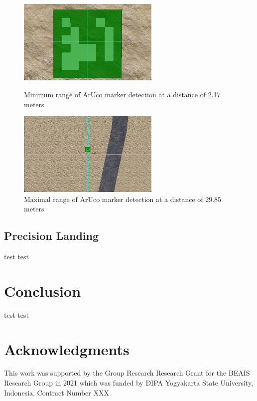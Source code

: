 \documentclass[a4paper]{jpconf}
\begin{document}
\begin{figure}[h]
    \centering
    \begin{minipage}{15pc}
        \includegraphics[width=16pc]{ArUco-at-2m.png}
        \caption{\label{label}Minimum range of ArUco marker detection at a distance of 2.17 meters}
    \end{minipage}\hspace{2pc}%
    \begin{minipage}{15pc}
        \includegraphics[width=16pc]{ArUco-at-29m.png}
        \caption{\label{label}Maximal range of ArUco marker detection at a distance of 29.85 meters}
    \end{minipage}
\end{figure}

\subsection{Precision Landing}
test test

\section{Conclusion}
test test

\section*{Acknowledgments}
This work was supported by the Group Research Research Grant for the BEAIS Research Group in 2021 which was funded by DIPA Yogyakarta State University, Indonesia, Contract Number XXX
\end{document}
